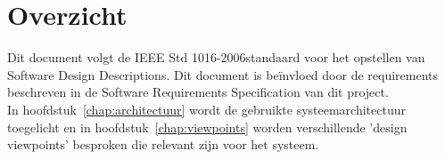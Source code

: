 \section{Overzicht}
Dit document volgt de IEEE Std 1016-2006\texttrademark \space standaard voor het opstellen van Software Design Descriptions. 
Dit document is be\"{i}nvloed door de requirements beschreven in de Software Requirements Specification van dit project.\cite{SRS}\\ 
In hoofdstuk~\ref{chap:architectuur} wordt de gebruikte systeemarchitectuur toegelicht en in hoofdstuk~\ref{chap:viewpoints} worden verschillende 'design viewpoints' besproken die relevant zijn voor het systeem.